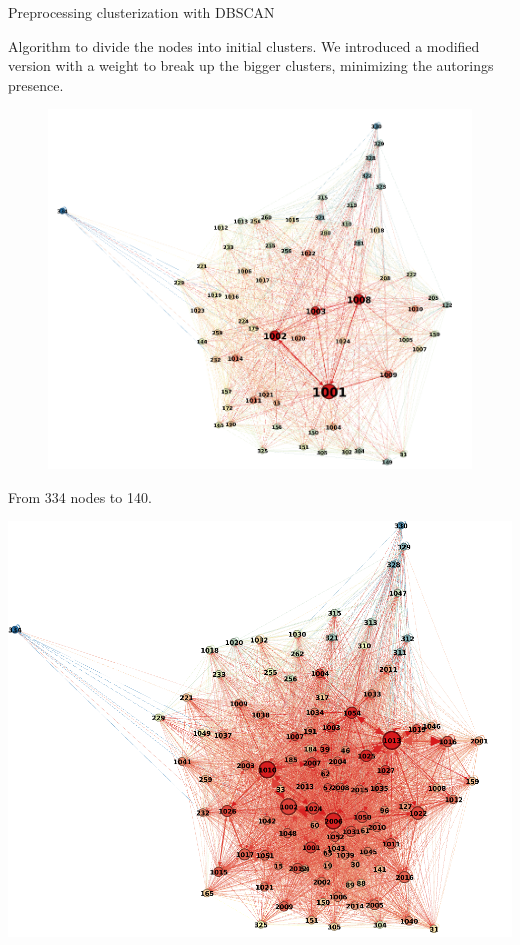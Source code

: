 \documentclass{beamer}
\begin{document}
\begin{frame}{Preprocessing clusterization with DBSCAN}

Algorithm to divide the nodes into initial clusters. We introduced a modified version with a weight to break up the \alert{bigger clusters}, minimizing the \alert{autorings} presence.


\begin{figure}[H]


		\centering

		\includegraphics[width=70 mm]{pictures/old_model_gephi.png}

\end{figure}

\end{frame}

\begin{frame}
From \alert{334} nodes to \alert{140}.
	\centering

	\includegraphics[width=100 mm]{pictures/new_model_gephi.png}

\end{frame}
\end{document}
